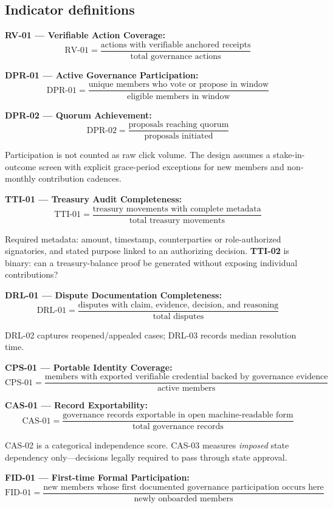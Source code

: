 \documentclass[sigconf]{acmart}
\begin{document}
\subsection{Indicator definitions}

\textbf{RV-01 --- Verifiable Action Coverage:}
\[ \text{RV-01} = \frac{\text{actions with verifiable anchored receipts}}{\text{total governance actions}} \]

\textbf{DPR-01 --- Active Governance Participation:}
\[ \text{DPR-01} = \frac{\text{unique members who vote or propose in window}}{\text{eligible members in window}} \]

\textbf{DPR-02 --- Quorum Achievement:}
\[ \text{DPR-02} = \frac{\text{proposals reaching quorum}}{\text{proposals initiated}} \]

Participation is not counted as raw click volume. The design assumes a stake-in-outcome screen with explicit grace-period exceptions for new members and non-monthly contribution cadences.

\textbf{TTI-01 --- Treasury Audit Completeness:}
\[ \text{TTI-01} = \frac{\text{treasury movements with complete metadata}}{\text{total treasury movements}} \]

Required metadata: amount, timestamp, counterparties or role-authorized signatories, and stated purpose linked to an authorizing decision. \textbf{TTI-02} is binary: can a treasury-balance proof be generated without exposing individual contributions?

\textbf{DRL-01 --- Dispute Documentation Completeness:}
\[ \text{DRL-01} = \frac{\text{disputes with claim, evidence, decision, and reasoning}}{\text{total disputes}} \]

DRL-02 captures reopened/appealed cases; DRL-03 records median resolution time.

\textbf{CPS-01 --- Portable Identity Coverage:}
\[ \text{CPS-01} = \frac{\text{members with exported verifiable credential backed by governance evidence}}{\text{active members}} \]

\textbf{CAS-01 --- Record Exportability:}
\[ \text{CAS-01} = \frac{\text{governance records exportable in open machine-readable form}}{\text{total governance records}} \]

CAS-02 is a categorical independence score. CAS-03 measures \textit{imposed} state dependency only---decisions legally required to pass through state approval.

\textbf{FID-01 --- First-time Formal Participation:}
\[ \text{FID-01} = \frac{\text{new members whose first documented governance participation occurs here}}{\text{newly onboarded members}} \]
\end{document}

